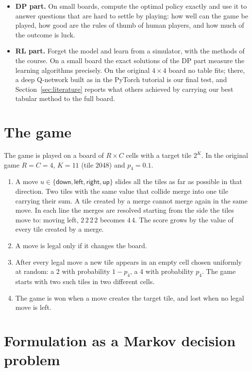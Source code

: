 \documentclass[11pt,a4paper]{article}
\theoremstyle{remark}
\newcommand{\act}[1]{\textsf{#1}}
\begin{document}
\begin{itemize}[leftmargin=*]
\item \textbf{DP part.} On small boards, compute the optimal policy exactly and use it to answer questions that are hard to settle by playing: how well can the game be played, how good are the rules of thumb of human players, and how much of the outcome is luck.
\item \textbf{RL part.} Forget the model and learn from a simulator, with the methods of the course. On a small board the exact solutions of the DP part measure the learning algorithms precisely. On the original $4\times4$ board no table fits; there, a deep Q-network built as in the PyTorch tutorial is our final test, and Section~\ref{sec:literature} reports what others achieved by carrying our best tabular method to the full board.
\end{itemize}

\section{The game}

The game is played on a board of $R\times C$ cells with a target tile $2^K$. In the original game $R=C=4$, $K=11$ (tile 2048) and $p_4=0.1$.

\begin{enumerate}[leftmargin=*]
\item A move $u\in\{\act{down},\act{left},\act{right},\act{up}\}$ slides all the tiles as far as possible in that direction. Two tiles with the same value that collide merge into one tile carrying their sum. A tile created by a merge cannot merge again in the same move. In each line the merges are resolved starting from the side the tiles move to: moving left, $2\,2\,2\,2$ becomes $4\,4$. The score grows by the value of every tile created by a merge.
\item A move is legal only if it changes the board.
\item After every legal move a new tile appears in an empty cell chosen uniformly at random: a 2 with probability $1-p_4$, a 4 with probability $p_4$. The game starts with two such tiles in two different cells.
\item The game is won when a move creates the target tile, and lost when no legal move is left.
\end{enumerate}

\section{Formulation as a Markov decision problem}
\label{sec:formulation}
\end{document}
